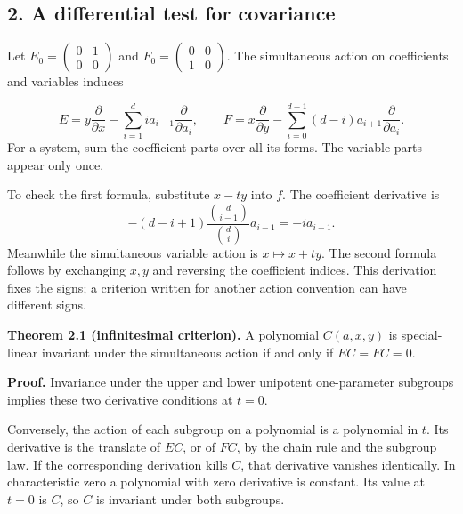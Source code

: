 \documentclass[
]{article}
\begin{document}
\subsection{2. A differential test for covariance}\label{section-2}

Let \(E_0=\left(\begin{smallmatrix}0&1\\0&0\end{smallmatrix}\right)\)
and \(F_0=\left(\begin{smallmatrix}0&0\\1&0\end{smallmatrix}\right)\).
The simultaneous action on coefficients and variables induces
\protect{}\label{equation-B2}{}

\[
E=y\frac{\partial}{\partial x}
-\sum_{i=1}^d i a_{i-1}\frac{\partial}{\partial a_i},
\qquad
F=x\frac{\partial}{\partial y}
-\sum_{i=0}^{d-1}(d-i)a_{i+1}\frac{\partial}{\partial a_i}.
\tag{B2}
\] For a system, sum the coefficient parts over all its forms. The
variable parts appear only once.

To check the first formula, substitute \(x-ty\) into \(f\). The
coefficient derivative is \[
-(d-i+1)\frac{\binom d{i-1}}{\binom di}a_{i-1}=-i a_{i-1}.
\] Meanwhile the simultaneous variable action is \(x\mapsto x+ty\). The
second formula follows by exchanging \(x,y\) and reversing the
coefficient indices. This derivation fixes the signs; a criterion
written for another action convention can have different signs.

\protect{}\label{theorem-2-1}{}

\textbf{Theorem 2.1 (infinitesimal criterion).} A polynomial
\(C(a,x,y)\) is special-linear invariant under the simultaneous action
if and only if \(EC=FC=0\).

\textbf{Proof.} Invariance under the upper and lower unipotent
one-parameter subgroups implies these two derivative conditions at
\(t=0\).

Conversely, the action of each subgroup on a polynomial is a polynomial
in \(t\). Its derivative is the translate of \(EC\), or of \(FC\), by
the chain rule and the subgroup law. If the corresponding derivation
kills \(C\), that derivative vanishes identically. In characteristic
zero a polynomial with zero derivative is constant. Its value at \(t=0\)
is \(C\), so \(C\) is invariant under both subgroups.
\end{document}
